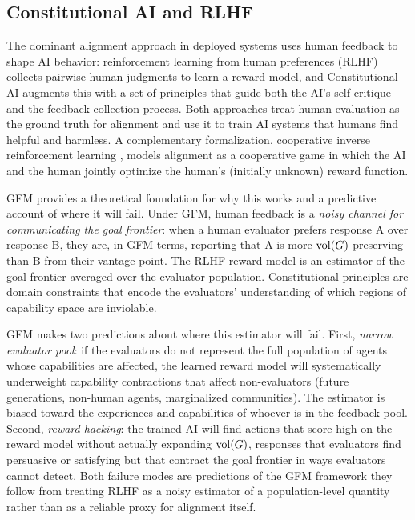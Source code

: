 \subsection{Constitutional AI and RLHF}
\label{sec:connections_rlhf}

The dominant alignment approach in deployed systems uses human feedback to
shape AI behavior: reinforcement learning from human preferences (RLHF)
\citep{christiano2017deep} collects pairwise human judgments to learn a reward
model, and Constitutional AI \citep{bai2022constitutional} augments this with a
set of principles that guide both the AI's self-critique and the feedback
collection process. Both approaches treat human evaluation as the ground truth
for alignment and use it to train AI systems that humans find helpful and
harmless. A complementary formalization, cooperative inverse reinforcement
learning \citep{hadfield2017cooperative}, models alignment as a cooperative
game in which the AI and the human jointly optimize the human's (initially
unknown) reward function.

GFM provides a theoretical foundation for why this works and a predictive
account of where it will fail. Under GFM, human feedback is a \emph{noisy
channel for communicating the goal frontier}: when a human evaluator prefers
response A over response B, they are, in GFM terms, reporting that A is more
$\operatorname{vol}(G)$-preserving than B from their vantage point. The RLHF reward model is
an estimator of the goal frontier averaged over the evaluator population.
Constitutional principles are domain constraints that encode the evaluators'
understanding of which regions of capability space are inviolable.

GFM makes two predictions about where this estimator will fail. First,
\emph{narrow evaluator pool}: if the evaluators do not represent the full
population of agents whose capabilities are affected, the learned reward model
will systematically underweight capability contractions that affect
non-evaluators (future generations, non-human agents, marginalized
communities). The estimator is biased toward the experiences and capabilities
of whoever is in the feedback pool. Second, \emph{reward hacking}: the trained
AI will find actions that score high on the reward model without actually
expanding $\operatorname{vol}(G)$, responses that evaluators find persuasive or satisfying
but that contract the goal frontier in ways evaluators cannot detect. Both
failure modes are predictions of the GFM framework they follow from treating
RLHF as a noisy estimator of a population-level quantity rather than as a
reliable proxy for alignment itself.
